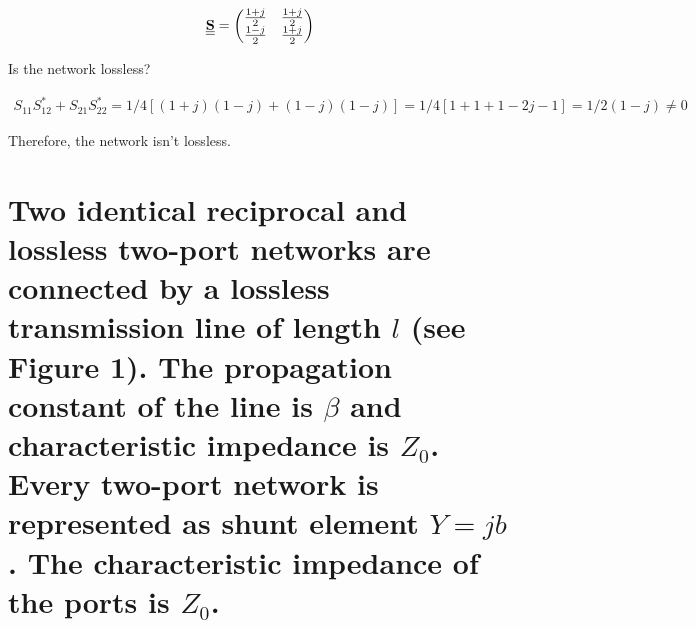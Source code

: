 \documentclass[12pt, letterpaper]{article}
\begin{document}
\begin{align}
  \underline{\underline{\vb{S}}}=
  \begin{pmatrix}
    {1+j\over2} & {1+j\over2}\\
    {1-j\over2} & {1+j\over2}
  \end{pmatrix}
\end{align}

Is the network lossless?

\begin{align*}
  S_{11}S_{12}^*+S_{21}S_{22}^*=1/4[(1+j)(1-j)+(1-j)(1-j)]=1/4[1+1+1-2j-1]=1/2(1-j)\neq0
\end{align*}

{\color{blue}Therefore, the network isn't lossless.}

\section{Two identical reciprocal and lossless two-port networks are connected by a lossless transmission line of length $l$ (see Figure 1). The propagation constant of the line is $\beta$ and characteristic impedance is $Z_0$. Every two-port network is represented as shunt element $Y=jb$. The characteristic impedance of the ports is $Z_0$.}
\end{document}
